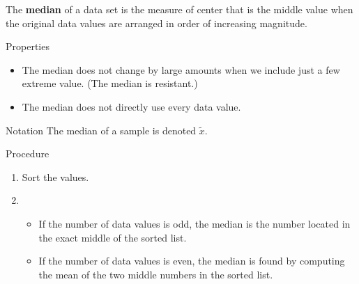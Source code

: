 \documentclass{beamer}
\begin{document}
\begin{frame}
\begin{definition}
The \textbf{median} of a data set is the measure of center that is the middle value when the original data values are arranged in order of increasing magnitude.
\end{definition}\pause

\begin{block}{Properties}
\begin{itemize}
\item The median does not change by large amounts when we include just a few extreme value. (The median is resistant.)\pause
\item The median does not directly use every data value.
\end{itemize}
\end{block}\pause

\begin{block}{Notation}
The median of a sample is denoted $\tilde{x}$.
\end{block}\pause

\begin{block}{Procedure}
\begin{enumerate}
\item Sort the values.
\item 
\begin{itemize}
\item If the number of data values is odd, the median is the number located in the exact middle of the sorted list.
\item If the number of data values is even, the median is found by computing the mean of the two middle numbers in the sorted list.
\end{itemize}
\end{enumerate}
\end{block}
\end{frame}
\end{document}
